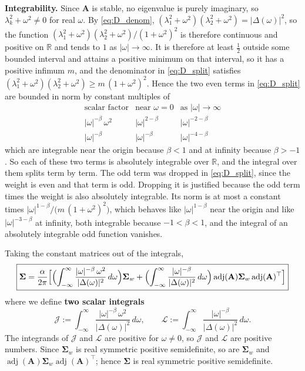\documentclass[12pt]{article}
\newcommand{\R}{\mathbb{R}}
\newcommand{\adj}{\operatorname{adj}}
\begin{document}
\textbf{Integrability.} Since $\mathbf{A}$ is stable, no eigenvalue is purely imaginary, so $\lambda_k^2+\omega^2\neq0$ for real
$\omega$. By \eqref{eq:D_denom}, $(\lambda_1^2+\omega^2)(\lambda_2^2+\omega^2)=|\Delta(\omega)|^2$, so the function
$(\lambda_1^2+\omega^2)(\lambda_2^2+\omega^2)/(1+\omega^2)^2$ is therefore continuous and
positive on $\R$ and tends to $1$ as $|\omega|\to\infty$. It is therefore at least $\frac12$ outside some bounded interval and attains a positive
minimum on that interval, so it has a positive infimum $m$, and the denominator in
\eqref{eq:D_split} satisfies $(\lambda_1^2+\omega^2)(\lambda_2^2+\omega^2)\ge m\,(1+\omega^2)^2$. Hence the two
even terms in \eqref{eq:D_split} are bounded in norm by constant multiples of
\begin{equation*}
\begin{array}{lcc}
    \text{scalar factor} & \text{near }\omega=0 & \text{as }|\omega|\to\infty\\[2pt]
    \hline
    |\omega|^{-\beta}\,\omega^2 & |\omega|^{2-\beta} & |\omega|^{-2-\beta}\\
    |\omega|^{-\beta} & |\omega|^{-\beta} & |\omega|^{-4-\beta}
\end{array}
\end{equation*}
which are integrable near the origin because $\beta<1$ and at infinity because $\beta>-1$. So each of these two terms is
absolutely integrable over $\R$, and the integral over them splits term by term. The odd term was dropped in
\eqref{eq:D_split}, since the weight is even and that term is odd. Dropping it is justified because the odd
term times the weight is also absolutely integrable. Its norm is at most a constant times
$|\omega|^{1-\beta}/\bigl(m\,(1+\omega^2)^2\bigr)$, which behaves like $|\omega|^{1-\beta}$ near the
origin and like $|\omega|^{-3-\beta}$ at infinity, both integrable because $-1<\beta<1$, and the integral of an absolutely
integrable odd function vanishes.

Taking the constant matrices out of the integrals,
\begin{equation}
    \boxed{\boldsymbol{\Sigma}
    =\frac{\alpha}{2\pi}\Bigl[\Bigl(\int_{-\infty}^{\infty}\frac{|\omega|^{-\beta}\,\omega^2}{|\Delta(\omega)|^2}\,d\omega\Bigr)\boldsymbol\Sigma_w
    +\Bigl(\int_{-\infty}^{\infty}\frac{|\omega|^{-\beta}}{|\Delta(\omega)|^2}\,d\omega\Bigr)\adj(\mathbf{A})\boldsymbol\Sigma_w\adj(\mathbf{A})^\top\Bigr]}
    \label{eq:D_split2}
\end{equation}
where we define \textbf{two scalar integrals}
\begin{equation}
    \mathcal{J}:=\int_{-\infty}^{\infty}\frac{|\omega|^{-\beta}\,\omega^2}{|\Delta(\omega)|^2}\,d\omega,
    \qquad
    \mathcal{L}:=\int_{-\infty}^{\infty}\frac{|\omega|^{-\beta}}{|\Delta(\omega)|^2}\,d\omega.
    \label{eq:D_JLdef}
\end{equation}
The integrands of $\mathcal{J}$ and $\mathcal{L}$ are positive for $\omega\neq0$, so $\mathcal{J}$ and $\mathcal{L}$ are
positive numbers. Since $\boldsymbol\Sigma_w$ is real symmetric positive semidefinite, so are
$\boldsymbol\Sigma_w$ and $\adj(\mathbf A)\boldsymbol\Sigma_w\adj(\mathbf A)^\top$; hence $\boldsymbol\Sigma$ is real symmetric positive semidefinite.
\end{document}
